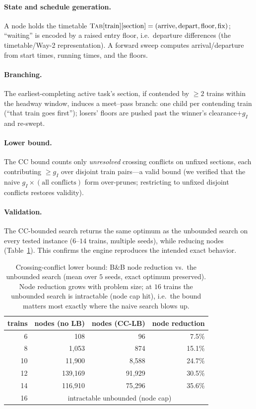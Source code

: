 \documentclass[11pt]{article}
\begin{document}
\paragraph{State and schedule generation.} A node holds the timetable
$\textsc{Tab}[\text{train}][\text{section}]=(\text{arrive},\text{depart},\text{floor},\text{fix})$;
``waiting'' is encoded by a raised entry floor, i.e.\ departure differences (the
timetable/Way-2 representation). A forward sweep computes arrival/departure from start times,
running times, and the floors.

\paragraph{Branching.} The earliest-completing active task's section, if contended by
$\ge 2$ trains within the headway window, induces a meet--pass branch: one child per
contending train (``that train goes first''); losers' floors are pushed past the winner's
clearance$+g_I$ and re-swept.

\paragraph{Lower bound.} The CC bound counts only \emph{unresolved} crossing conflicts on
unfixed sections, each contributing $\ge g_I$ over disjoint train pairs---a valid bound (we
verified that the naive $g_I\times(\text{all conflicts})$ form over-prunes; restricting to
unfixed disjoint conflicts restores validity).

\paragraph{Validation.} The CC-bounded search returns the same optimum as the unbounded
search on every tested instance ($6$--$14$ trains, multiple seeds), while reducing nodes
(Table~\ref{tab:lb}). This confirms the engine reproduces the intended exact behavior.

\begin{table}[t]\centering
\caption{Crossing-conflict lower bound: B\&B node reduction vs.\ the unbounded search
(mean over $5$ seeds, exact optimum preserved). Node reduction grows with problem size; at
$16$ trains the unbounded search is intractable (node cap hit), i.e.\ the bound matters most
exactly where the naive search blows up.}\label{tab:lb}
\begin{tabular}{rrrr}
\toprule
trains & nodes (no LB) & nodes (CC-LB) & node reduction \\
\midrule
6  & 108     & 96     & 7.5\% \\
8  & 1{,}053 & 874    & 15.1\% \\
10 & 11{,}900& 8{,}588& 24.7\% \\
12 & 139{,}169 & 91{,}929 & 30.5\% \\
14 & 116{,}910 & 75{,}296 & 35.6\% \\
16 & \multicolumn{3}{c}{intractable unbounded (node cap)} \\
\bottomrule
\end{tabular}
\end{table}
\end{document}
